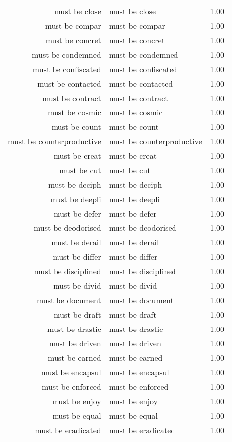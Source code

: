 \begin{table}[ht]
\begin{tabular}{rlr}
  must be close & must be close & 1.00 \\ 
  must be compar & must be compar & 1.00 \\ 
  must be concret & must be concret & 1.00 \\ 
  must be condemned & must be condemned & 1.00 \\ 
  must be confiscated & must be confiscated & 1.00 \\ 
  must be contacted & must be contacted & 1.00 \\ 
  must be contract & must be contract & 1.00 \\ 
  must be cosmic & must be cosmic & 1.00 \\ 
  must be count & must be count & 1.00 \\ 
  must be counterproductive & must be counterproductive & 1.00 \\ 
  must be creat & must be creat & 1.00 \\ 
  must be cut & must be cut & 1.00 \\ 
  must be deciph & must be deciph & 1.00 \\ 
  must be deepli & must be deepli & 1.00 \\ 
  must be defer & must be defer & 1.00 \\ 
  must be deodorised & must be deodorised & 1.00 \\ 
  must be derail & must be derail & 1.00 \\ 
  must be differ & must be differ & 1.00 \\ 
  must be disciplined & must be disciplined & 1.00 \\ 
  must be divid & must be divid & 1.00 \\ 
  must be document & must be document & 1.00 \\ 
  must be draft & must be draft & 1.00 \\ 
  must be drastic & must be drastic & 1.00 \\ 
  must be driven & must be driven & 1.00 \\ 
  must be earned & must be earned & 1.00 \\ 
  must be encapsul & must be encapsul & 1.00 \\ 
  must be enforced & must be enforced & 1.00 \\ 
  must be enjoy & must be enjoy & 1.00 \\ 
  must be equal & must be equal & 1.00 \\ 
  must be eradicated & must be eradicated & 1.00 \\ 

\end{tabular}
\end{table}
